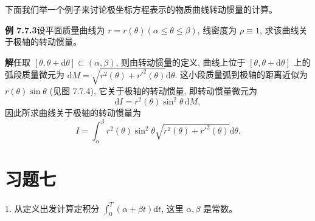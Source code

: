 \documentclass[UTF8, 12pt, fontset=fandol, oneside]{ctexart}
\begin{document}
下面我们举一个例子来讨论极坐标方程表示的物质曲线转动惯量的计算。

\noindent\textbf{例 7.7.3}\quad 设平面质量曲线为 $r=r(\theta)(\alpha\leq\theta\leq\beta)$, 线密度为 $\rho\equiv1$, 求该曲线关于极轴的转动惯量。

\noindent\textbf{解}\quad 任取 $[\theta,\theta+\mathrm d\theta]\subset(\alpha,\beta)$, 则由转动惯量的定义, 曲线上位于 $[\theta,\theta+\mathrm d\theta]$ 上的弧段质量微元为 $\mathrm dM=\sqrt{r^2(\theta)+r'^2(\theta)}\mathrm d\theta$. 这小段质量弧到极轴的距离近似为 $r(\theta)\sin\theta$ (见图 7.7.4), 它关于极轴的转动惯量, 即转动惯量微元为
\[
  \mathrm dI=r^2(\theta)\sin^2\theta\,\mathrm dM,
\]
因此所求曲线关于极轴的转动惯量为
\[
  I=\int_\alpha^\beta r^2(\theta)\sin^2\theta
  \sqrt{r^2(\theta)+r'^2(\theta)}\mathrm d\theta.
\]

\section*{习题七}

1. 从定义出发计算定积分 $\int_0^T(\alpha+\beta t)\mathrm dt$, 这里 $\alpha,\beta$ 是常数。
\end{document}
